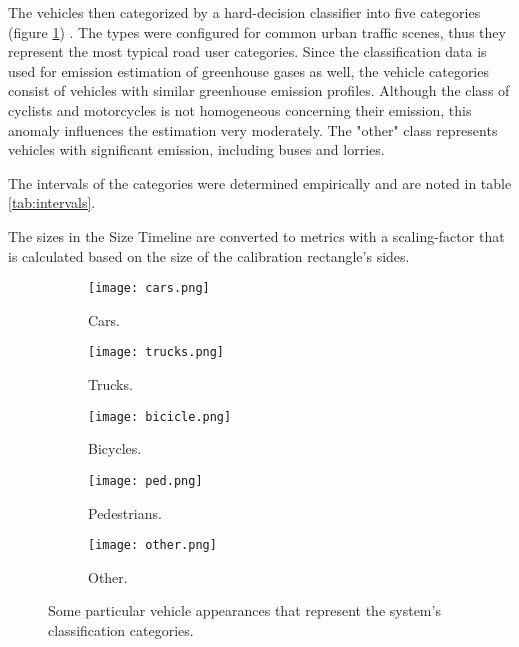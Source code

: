 The vehicles then categorized by a hard-decision classifier into five categories (figure \ref{fig:types}) .
The types were configured for common urban traffic scenes, thus they represent the most typical road user categories.
Since the classification data is used for emission estimation of greenhouse gases as well, the vehicle categories consist of vehicles with similar greenhouse emission profiles.
Although the class of cyclists and motorcycles is not homogeneous concerning their emission, this anomaly influences the estimation very moderately.
The "other" class represents vehicles with significant emission, including buses and lorries. 

The intervals of the categories were determined empirically and are noted in table \ref{tab:intervals}.

The sizes in the Size Timeline are converted to metrics with a scaling-factor that is calculated based on the size of the calibration rectangle's sides.

\begin{figure}[!h]
	\centering
	\begin{adjustbox}{minipage=\textwidth,scale=0.95}
	\centering
	\begin{subfigure}[b]{0.22\textwidth}
	\texttt{[image: cars.png]}
	\caption{Cars.}
	\end{subfigure}
	\quad%
	\begin{subfigure}[b]{0.22\textwidth}
		\texttt{[image: trucks.png]}
	\caption{Trucks.}
	\end{subfigure}
	\quad%
	\begin{subfigure}[b]{0.22\textwidth}
		\texttt{[image: bicicle.png]}
	\caption{Bicycles.}
	\end{subfigure}
	\quad%
	\begin{subfigure}[b]{0.22\textwidth}
		\texttt{[image: ped.png]}
	\caption{Pedestrians.}
	\end{subfigure}
	\quad
	\begin{subfigure}[b]{0.4\textwidth}
		\texttt{[image: other.png]}
	\caption{Other.}
	\end{subfigure}

	\caption[Particular vehicle appearances for each category]{Some particular vehicle appearances that represent the system's classification categories.\label{fig:types}}
    \end{adjustbox}
\end{figure}



